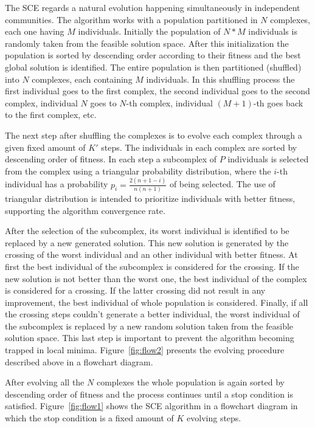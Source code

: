 The SCE regards a natural  evolution happening
simultaneously in independent communities.
The algorithm works with a population partitioned in $N$ complexes, each one
having $M$ individuals.
Initially the population of $N*M$ individuals is randomly taken from the
feasible solution space.
After this initialization the population is sorted by descending order according
to their fitness and the best global solution is identified.
The entire population is then partitioned (shuffled) into $N$ complexes,
each containing $M$ individuals.
In this shuffling process the first individual goes to the first complex, the second
individual goes to the second complex, individual $N$ goes to $N$-th complex,
individual $(M+1)$-th goes back to the first complex, etc.

The next step after shuffling the complexes is to evolve each complex through
a given fixed amount of $K'$ steps.
The individuals in each complex are sorted by descending order of fitness.
In each step a subcomplex of $P$ individuals is selected from the
complex using a triangular probability distribution, where the $i$-th individual
has a probability $p_i = \frac{2(n+1-i)}{n(n+1)}$ of being selected.
The use of triangular distribution is intended to prioritize individuals with
better fitness, supporting the algorithm convergence rate.

After the selection of the subcomplex, its worst individual is identified to
be replaced by a new generated solution.
This new solution is generated by the crossing of the worst individual and an
other individual with better fitness.
At first the best individual of the subcomplex is considered for the crossing.
If the new solution is not better than the worst one, the best individual
of the complex is considered for a crossing.
If the latter crossing did not result in any improvement, the best individual
of whole population is considered.
Finally, if all the crossing steps couldn't generate a better individual,
the worst individual of the subcomplex is replaced by a new random solution taken
from the feasible solution space.
This last step is important to prevent the algorithm becoming trapped in local minima.
Figure~\ref{fig:flow2} presents the evolving procedure described above in a flowchart diagram.

After evolving all the $N$ complexes the whole population is again
sorted by descending order of fitness and the process continues until
a stop condition is satisfied.
Figure~\ref{fig:flow1} shows the SCE algorithm in a flowchart diagram in which
the stop condition is a fixed amount of $K$ evolving steps.

